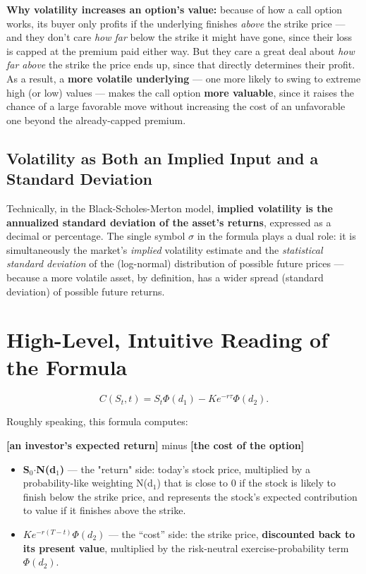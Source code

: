 \documentclass[12pt,openany]{book}
\theoremstyle{definition}
\theoremstyle{remark}
\begin{document}
\textbf{Why volatility increases an option's value:} because of how a call option works, its buyer only profits if the underlying finishes \emph{above} the strike price --- and they don't care \emph{how far} below the strike it might have gone, since their loss is capped at the premium paid either way. But they care a great deal about \emph{how far above} the strike the price ends up, since that directly determines their profit. As a result, a \textbf{more volatile underlying} --- one more likely to swing to extreme high (or low) values --- makes the call option \textbf{more valuable}, since it raises the chance of a large favorable move without increasing the cost of an unfavorable one beyond the already-capped premium.

\subsection{Volatility as Both an Implied Input and a Standard Deviation}

Technically, in the Black-Scholes-Merton model, \textbf{implied volatility is the annualized standard deviation of the asset's returns}, expressed as a decimal or percentage. The single symbol \textbf{\(\sigma\)} in the formula plays a dual role: it is simultaneously the market's \emph{implied} volatility estimate and the \emph{statistical standard deviation} of the (log-normal) distribution of possible future prices --- because a more volatile asset, by definition, has a wider spread (standard deviation) of possible future returns.

\section{High-Level, Intuitive Reading of the Formula}

\[\boxed{C(S_t,t)=S_t\Phi(d_1)-Ke^{-r\tau}\Phi(d_2).}\]

Roughly speaking, this formula computes:

\textbf{[an investor's expected return]} minus \textbf{[the cost of the option]}

\begin{itemize}
\item \textbf{S\(_0\)\(\cdot\)N(d\(_1\))} --- the "return" side: today's stock price, multiplied by a probability-like weighting N(d\(_1\)) that is close to 0 if the stock is likely to finish below the strike price, and represents the stock's expected contribution to value if it finishes above the strike.


\item \(Ke^{-r(T-t)}\Phi(d_2)\) --- the ``cost'' side: the strike price,
\textbf{discounted back to its present value}, multiplied by the
risk-neutral exercise-probability term \(\Phi(d_2)\).


\end{itemize}
\end{document}
